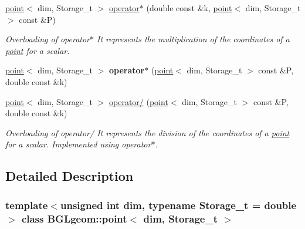 \begin{DoxyCompactItemize}
\item 
\hypertarget{classBGLgeom_1_1point_af8b8516a6b9a5023084f56a797addec2}{
\hyperlink{classBGLgeom_1_1point}{point}$<$ dim, Storage\_\-t $>$ \hyperlink{classBGLgeom_1_1point_af8b8516a6b9a5023084f56a797addec2}{operator$\ast$} (double const \&k, \hyperlink{classBGLgeom_1_1point}{point}$<$ dim, Storage\_\-t $>$ const \&P)}
\label{classBGLgeom_1_1point_af8b8516a6b9a5023084f56a797addec2}

\begin{DoxyCompactList}\small\item\em Overloading of operator$\ast$  It represents the multiplication of the coordinates of a \hyperlink{classBGLgeom_1_1point}{point} for a scalar. \item\end{DoxyCompactList}\item 
\hypertarget{classBGLgeom_1_1point_ad13f73cca1b08e65a53e15a1e90ab710}{
\hyperlink{classBGLgeom_1_1point}{point}$<$ dim, Storage\_\-t $>$ {\bfseries operator$\ast$} (\hyperlink{classBGLgeom_1_1point}{point}$<$ dim, Storage\_\-t $>$ const \&P, double const \&k)}
\label{classBGLgeom_1_1point_ad13f73cca1b08e65a53e15a1e90ab710}

\item 
\hypertarget{classBGLgeom_1_1point_a06655b175f2da9c002410104e88fe1e2}{
\hyperlink{classBGLgeom_1_1point}{point}$<$ dim, Storage\_\-t $>$ \hyperlink{classBGLgeom_1_1point_a06655b175f2da9c002410104e88fe1e2}{operator/} (\hyperlink{classBGLgeom_1_1point}{point}$<$ dim, Storage\_\-t $>$ const \&P, double const \&k)}
\label{classBGLgeom_1_1point_a06655b175f2da9c002410104e88fe1e2}

\begin{DoxyCompactList}\small\item\em Overloading of operator/  It represents the division of the coordinates of a \hyperlink{classBGLgeom_1_1point}{point} for a scalar. Implemented using operator$\ast$. \item\end{DoxyCompactList}\end{DoxyCompactItemize}


\subsection{Detailed Description}
\subsubsection*{template$<$unsigned int dim, typename Storage\_\-t = double$>$ class BGLgeom::point$<$ dim, Storage\_\-t $>$}

